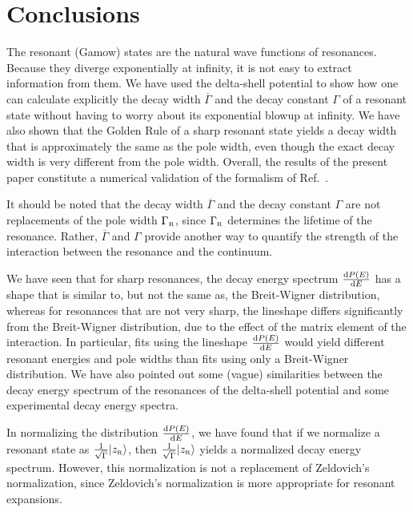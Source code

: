\documentclass[12pt]{article}
\newcommand{\rmd}{{\rm d}}
\newcommand{\zr}{z_{\text{\tiny R}}}
\newcommand{\gr}{\Gamma _{\text{\tiny R}}}
\begin{document}
\section{Conclusions}
\setcounter{equation}{0}
\label{sec:conclusions}



The resonant (Gamow) states are the natural wave functions of 
resonances. Because they diverge exponentially at 
infinity, it is not easy to extract information from them. We have used
the delta-shell potential to show how one can calculate explicitly
the decay width $\overline{\Gamma}$ and the decay constant $\Gamma$ of a 
resonant state without having to worry about its exponential blowup
at infinity. We have 
also shown that the Golden Rule of a sharp resonant state yields a decay 
width that is approximately the same as the pole 
width, even though the exact decay width is very different from the pole width.
Overall, the results of the present paper constitute a numerical validation 
of the formalism of Ref.~\cite{NPA15}.

It should be noted that the decay width $\overline{\Gamma}$ and the decay
constant $\Gamma$ are not replacements of the pole width $\gr$, since 
$\gr$ determines the lifetime of the resonance. Rather, $\overline{\Gamma}$ and
$\Gamma$ provide another way to quantify the strength of the interaction between
the resonance and the continuum.

We have seen that for sharp resonances, the decay energy spectrum 
$\frac{\rmd P(E)}{\rmd E}$ has a shape that is similar to, but not the 
same as, the Breit-Wigner distribution, whereas 
for resonances that are not very sharp, the lineshape differs significantly
from the Breit-Wigner distribution, due to the effect of the
matrix element of the interaction. In particular, fits using the lineshape
$\frac{\rmd P(E)}{\rmd E}$ would yield different resonant energies and
pole widths than fits using only a Breit-Wigner distribution. We have also
pointed out some (vague) similarities between the decay energy spectrum of the
resonances of the delta-shell potential and some experimental decay energy
spectra.

In normalizing the distribution $\frac{\rmd P(E)}{\rmd E}$, we have found
that if we normalize a resonant state as 
$\frac{1}{\sqrt{\Gamma}}|\zr \rangle$, then 
$\frac{1}{\sqrt{\Gamma}}|\zr \rangle$ yields a normalized decay
energy spectrum. However, this normalization is not a replacement
of Zeldovich's normalization, since Zeldovich's normalization is more
appropriate for resonant expansions.
\end{document}
